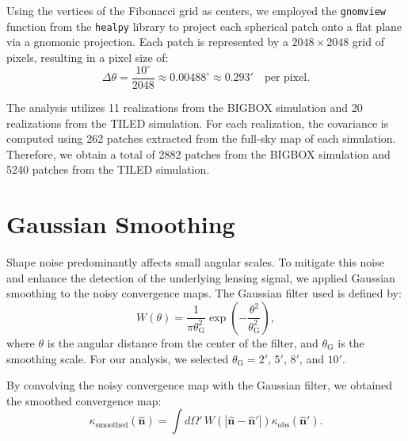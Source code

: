 Using the vertices of the Fibonacci grid as centers, we employed the \texttt{gnomview} function from the \texttt{healpy} library \citep{Zonca2019} to project each spherical patch onto a flat plane via a gnomonic projection. Each patch is represented by a $2048 \times 2048$ grid of pixels, resulting in a pixel size of:
\begin{equation}
    \Delta \theta = \frac{10^\circ}{2048} \approx 0.00488^\circ \approx 0.293' \quad \text{per pixel}.
\end{equation}

The analysis utilizes 11 realizations from the BIGBOX simulation and 20 realizations from the TILED simulation. For each realization, the covariance is computed using 262 patches extracted from the full-sky map of each simulation.
Therefore, we obtain a total of 2882 patches from the BIGBOX simulation and 5240 patches from the TILED simulation. 

\section{Gaussian Smoothing}
Shape noise predominantly affects small angular scales. To mitigate this noise and enhance the detection of the underlying lensing signal, we applied Gaussian smoothing to the noisy convergence maps. The Gaussian filter used is defined by:
\begin{equation}
    W(\theta) = \frac{1}{\pi \theta_{\mathrm{G}}^2} \exp\left( -\frac{\theta^2}{\theta_{\mathrm{G}}^2} \right),
\end{equation}
where $\theta$ is the angular distance from the center of the filter, and $\theta_{\mathrm{G}}$ is the smoothing scale. For our analysis, we selected $\theta_{\mathrm{G}} = 2'$, $5'$, $8'$, and $10'$.

By convolving the noisy convergence map with the Gaussian filter, we obtained the smoothed convergence map:
\begin{equation}
    \kappa_{\mathrm{smoothed}}(\hat{\mathbf{n}}) = \int d\Omega' \, W(|\hat{\mathbf{n}} - \hat{\mathbf{n}}'|) \kappa_{\mathrm{obs}}(\hat{\mathbf{n}}').
\end{equation}

